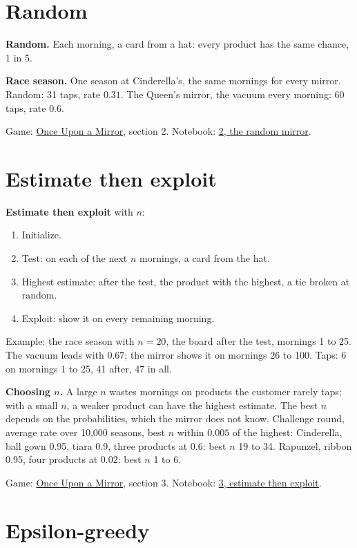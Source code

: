 \documentclass[11pt,a4paper]{article}
\newcommand{\term}[1]{\textbf{#1}}
\newcommand{\beside}[2]{\par\noindent\sbox{\besidebox}{#1}\usebox{\besidebox}\hfill
  \begin{minipage}[c]{\dimexpr\textwidth-\wd\besidebox-1.5em\relax}\raggedright#2\end{minipage}\par}
\newcommand{\Mirror}{\href{https://eth-ainit-hs26.github.io/AINIT-PAGE/viz/we2/mirror/}{Once Upon a Mirror}}
\newcommand{\NbTwo}{\href{https://colab.research.google.com/github/eth-ainit-hs26/w2-cx-public/blob/main/03_cx_bandits_2_random_student.ipynb}{2, the random mirror}}
\newcommand{\NbThree}{\href{https://colab.research.google.com/github/eth-ainit-hs26/w2-cx-public/blob/main/03_cx_bandits_3_estimate_then_exploit_student.ipynb}{3, estimate then exploit}}
\begin{document}
\section{Random}

\term{Random.} Each morning, a card from a hat: every product has the same chance, 1 in 5.

\term{Race season.} One season at Cinderella's, the same mornings for every mirror. Random: 31 taps, rate $0.31$.
The Queen's mirror, the vacuum every morning: 60 taps, rate $0.6$.

Game: \Mirror, section 2. Notebook: \NbTwo.

\section{Estimate then exploit}

\term{Estimate then exploit} with $n$:
\begin{enumerate}
\item Initialize.
\item Test: on each of the next $n$ mornings, a card from the hat.
\item Highest estimate: after the test, the product with the highest, a tie broken at random.
\item Exploit: show it on every remaining morning.
\end{enumerate}

\beside{}{Example: the race season with $n = 20$, the board after the test,
mornings 1 to 25. The vacuum leads with $0.67$; the mirror shows it on mornings 26 to 100. Taps: 6 on mornings 1 to 25,
41 after, 47 in all.}

\term{Choosing $n$.} A large $n$ wastes mornings on products the customer rarely taps; with a small $n$, a weaker
product can have the highest estimate. The best $n$ depends on the probabilities, which the mirror does not know.
Challenge round, average rate over 10,000 seasons, best $n$ within $0.005$ of the highest: Cinderella, ball gown
0.95, tiara 0.9, three products at 0.6: best $n$ 19 to 34. Rapunzel, ribbon 0.95, four products at 0.02: best $n$ 1
to 6.

Game: \Mirror, section 3. Notebook: \NbThree.

\section{Epsilon-greedy}
\end{document}
